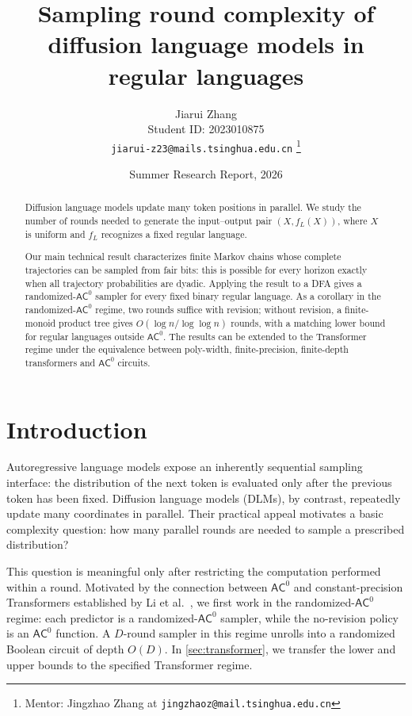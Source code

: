 \documentclass[10pt]{article}
\title{Sampling round complexity of diffusion language models in regular languages}
\author{Jiarui Zhang\\
Student ID: 2023010875\\
\texttt{jiarui-z23@mails.tsinghua.edu.cn}
\thanks{Mentor: Jingzhao Zhang at \texttt{jingzhaoz@mail.tsinghua.edu.cn}}}
\date{Summer Research Report, 2026}
\theoremstyle{definition}
\newcommand{\AC}{\mathsf{AC}}
\begin{document}
\maketitle

\begin{abstract}
Diffusion language models update many token positions in parallel.  We
study the number of rounds needed to generate the input--output pair
$(X,f_L(X))$, where $X$ is uniform and $f_L$ recognizes a fixed regular
language.

Our main technical result characterizes finite Markov chains whose complete
trajectories can be sampled from fair bits: this is possible for every horizon
exactly when all trajectory probabilities are dyadic.  Applying the result to
a DFA gives a randomized-$\AC^0$ sampler for every fixed binary regular
language.  As a corollary in the randomized-$\AC^0$ regime, two rounds suffice with
revision; without revision, a finite-monoid product tree gives
$O(\log n/\log\log n)$ rounds, with a matching lower bound for regular
languages outside $\AC^0$.  The results can be extended to the Transformer
regime under the equivalence between poly-width, finite-precision,
finite-depth transformers and $\AC^0$ circuits.
\end{abstract}

\section{Introduction}

Autoregressive language models expose an inherently sequential sampling
interface: the distribution of the next token is evaluated only after the
previous token has been fixed.  Diffusion language models (DLMs), by
contrast, repeatedly update many coordinates in parallel.  Their practical
appeal motivates a basic complexity question: how many parallel rounds are
needed to sample a prescribed distribution?

This question is meaningful only after restricting the computation performed
within a round.  Motivated by the connection between $\AC^0$ and
constant-precision Transformers established by Li et al.~\cite{li2024cot}, we
first work in the randomized-$\AC^0$ regime: each predictor is a
randomized-$\AC^0$ sampler, while the no-revision policy is an $\AC^0$
function.  A $D$-round sampler in this regime unrolls into a randomized
Boolean circuit of depth $O(D)$.  In \cref{sec:transformer}, we transfer the
lower and upper bounds to the specified Transformer regime.
\end{document}
